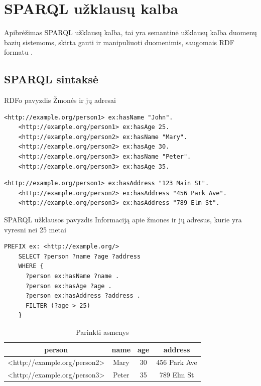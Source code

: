 \documentclass[10pt]{beamer}
\begin{document}
\section{SPARQL užklausų kalba}

\begin{frame}[fragile]{Apibrėžimas}
    SPARQL užklausų kalba, tai yra semantinė užklausų kalba duomenų bazių sistemoms, skirta gauti ir manipuliuoti duomenimis, saugomais RDF formatu \cite{wiki:sparql}.
\end{frame}

\subsection{SPARQL sintaksė}

\begin{frame}[fragile]{RDFo pavyzdis}
    Žmonės ir jų adresai
    \begin{lstlisting}[captionpos=b, caption=Žmonių RDF, label=lst:rdf1,
    basicstyle=\ttfamily\scriptsize,frame=single,breaklines=true]
    <http://example.org/person1> ex:hasName "John".
    <http://example.org/person1> ex:hasAge 25.
    <http://example.org/person2> ex:hasName "Mary".
    <http://example.org/person2> ex:hasAge 30.
    <http://example.org/person3> ex:hasName "Peter".
    <http://example.org/person3> ex:hasAge 35.
    \end{lstlisting}

    \begin{lstlisting}[captionpos=b, caption=Adresų RDF, label=lst:rdf2,
    basicstyle=\ttfamily\scriptsize,frame=single,breaklines=true]
    <http://example.org/person1> ex:hasAddress "123 Main St".
    <http://example.org/person2> ex:hasAddress "456 Park Ave".
    <http://example.org/person3> ex:hasAddress "789 Elm St".
    \end{lstlisting}
\end{frame}

\begin{frame}[fragile]{SPARQL užklausos pavyzdis}
    Informaciją apie žmones ir jų adresus, kurie yra vyresni nei 25 metai
    \begin{lstlisting}[captionpos=b, caption=Informaciją apie žmones ir jų adresus, label=lst:sparql, basicstyle=\ttfamily\scriptsize,frame=single]
    PREFIX ex: <http://example.org/>
    SELECT ?person ?name ?age ?address
    WHERE {
      ?person ex:hasName ?name .
      ?person ex:hasAge ?age .
      ?person ex:hasAddress ?address .
      FILTER (?age > 25)
    }
\end{lstlisting}


\begin{table}[h]
\centering
\begin{tabular}{|c|c|c|c|}
    \hline
    person & name & age & address \\
    \hline
    <http://example.org/person2> & Mary & 30 & 456 Park Ave \\
    <http://example.org/person3> & Peter & 35 & 789 Elm St \\
    \hline
    \end{tabular}
    \caption{Parinkti asmenys}
\end{table}

\end{frame}
\end{document}
